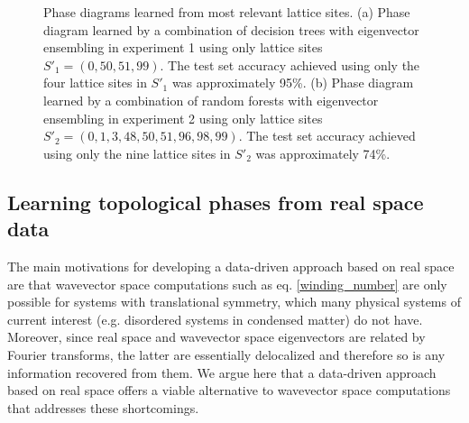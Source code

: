 \documentclass[fleqn,10pt]{wlscirep}
\begin{document}
\begin{figure}
\centering
{}
\caption{Phase diagrams learned from most relevant lattice sites. (a) Phase diagram learned by a combination of decision trees with eigenvector ensembling in experiment 1 using only lattice sites $S'_1 = (0, 50, 51, 99)$. The test set accuracy achieved using only the four lattice sites in $S'_1$ was approximately 95\%.  (b) Phase diagram learned by a combination of random forests with eigenvector ensembling in experiment 2 using only lattice sites $S'_2 = (0, 1, 3, 48, 50, 51, 96, 98, 99)$. The test set accuracy achieved using only the nine lattice sites in $S'_2$ was approximately 74\%.}
\label{less_feat}
\end{figure}

\subsection*{Learning topological phases from real space data}

The main motivations for developing a data-driven approach based on real space are that wavevector space computations such as eq. \eqref{winding_number} are only possible for systems with translational symmetry, which many physical systems of current interest (e.g. disordered systems in condensed matter) do not have. Moreover, since real space and wavevector space eigenvectors are related by Fourier transforms, the latter are essentially delocalized and therefore so is any information recovered from them. We argue here that a data-driven approach based on real space offers a viable alternative to wavevector space computations that addresses these shortcomings.
\end{document}
